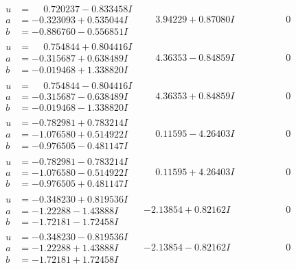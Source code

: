 \documentclass[1p]{elsarticle_modified}
\theoremstyle{definition}
\begin{document}
$$\begin{array}{c|c|c}
\begin{aligned}
u &= \phantom{-}0.720237 - 0.833458 I \\
a &= -0.323093 + 0.535044 I \\
b &= -0.886760 - 0.556851 I\end{aligned}
 & \phantom{-}3.94229 + 0.87080 I & \phantom{-0.000000 } 0 \\ \hline\begin{aligned}
u &= \phantom{-}0.754844 + 0.804416 I \\
a &= -0.315687 + 0.638489 I \\
b &= -0.019468 + 1.338820 I\end{aligned}
 & \phantom{-}4.36353 - 0.84859 I & \phantom{-0.000000 } 0 \\ \hline\begin{aligned}
u &= \phantom{-}0.754844 - 0.804416 I \\
a &= -0.315687 - 0.638489 I \\
b &= -0.019468 - 1.338820 I\end{aligned}
 & \phantom{-}4.36353 + 0.84859 I & \phantom{-0.000000 } 0 \\ \hline\begin{aligned}
u &= -0.782981 + 0.783214 I \\
a &= -1.076580 + 0.514922 I \\
b &= -0.976505 - 0.481147 I\end{aligned}
 & \phantom{-}0.11595 - 4.26403 I & \phantom{-0.000000 } 0 \\ \hline\begin{aligned}
u &= -0.782981 - 0.783214 I \\
a &= -1.076580 - 0.514922 I \\
b &= -0.976505 + 0.481147 I\end{aligned}
 & \phantom{-}0.11595 + 4.26403 I & \phantom{-0.000000 } 0 \\ \hline\begin{aligned}
u &= -0.348230 + 0.819536 I \\
a &= -1.22288 - 1.43888 I \\
b &= -1.72181 - 1.72458 I\end{aligned}
 & -2.13854 + 0.82162 I & \phantom{-0.000000 } 0 \\ \hline\begin{aligned}
u &= -0.348230 - 0.819536 I \\
a &= -1.22288 + 1.43888 I \\
b &= -1.72181 + 1.72458 I\end{aligned}
 & -2.13854 - 0.82162 I & \phantom{-0.000000 } 0\\

\end{array}$$
\end{document}
